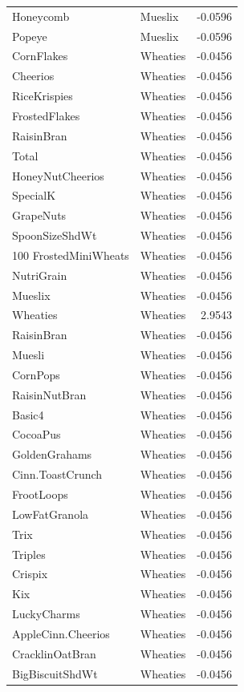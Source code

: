 \begin{longtable}{llr}
Honeycomb & Mueslix & -0.0596 \\
Popeye & Mueslix & -0.0596 \\
CornFlakes & Wheaties & -0.0456 \\
Cheerios & Wheaties & -0.0456 \\
RiceKrispies & Wheaties & -0.0456 \\
FrostedFlakes & Wheaties & -0.0456 \\
RaisinBran & Wheaties & -0.0456 \\
Total & Wheaties & -0.0456 \\
HoneyNutCheerios & Wheaties & -0.0456 \\
SpecialK & Wheaties & -0.0456 \\
GrapeNuts & Wheaties & -0.0456 \\
SpoonSizeShdWt & Wheaties & -0.0456 \\
100%
FrostedMiniWheats & Wheaties & -0.0456 \\
NutriGrain & Wheaties & -0.0456 \\
Mueslix & Wheaties & -0.0456 \\
Wheaties & Wheaties & 2.9543 \\
RaisinBran & Wheaties & -0.0456 \\
Muesli & Wheaties & -0.0456 \\
CornPops & Wheaties & -0.0456 \\
RaisinNutBran & Wheaties & -0.0456 \\
Basic4 & Wheaties & -0.0456 \\
CocoaPus & Wheaties & -0.0456 \\
GoldenGrahams & Wheaties & -0.0456 \\
Cinn.ToastCrunch & Wheaties & -0.0456 \\
FrootLoops & Wheaties & -0.0456 \\
LowFatGranola & Wheaties & -0.0456 \\
Trix & Wheaties & -0.0456 \\
Triples & Wheaties & -0.0456 \\
Crispix & Wheaties & -0.0456 \\
Kix & Wheaties & -0.0456 \\
LuckyCharms & Wheaties & -0.0456 \\
AppleCinn.Cheerios & Wheaties & -0.0456 \\
CracklinOatBran & Wheaties & -0.0456 \\
BigBiscuitShdWt & Wheaties & -0.0456 \\

\end{longtable}
